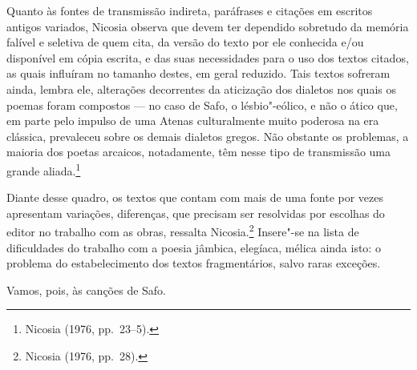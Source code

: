 Quanto às fontes de transmissão indireta, paráfrases e citações em escritos
antigos variados, Nicosia observa que devem ter dependido
sobretudo da memória falível e seletiva de quem cita, da versão do texto por
ele conhecida e/ou disponível em cópia escrita, e das suas necessidades para o
uso dos textos citados, as quais influíram no tamanho destes, em geral
reduzido. Tais textos sofreram ainda, lembra ele, alterações decorrentes da
aticização dos dialetos nos quais os poemas foram compostos --- no caso de Safo,
o lésbio"-eólico, e não o ático que, em parte pelo impulso de uma Atenas
culturalmente muito poderosa na era clássica, prevaleceu sobre os demais
dialetos gregos. Não obstante os problemas, a maioria dos poetas
arcaicos, notadamente, têm nesse tipo de transmissão uma grande aliada.\footnote{ Nicosia (1976, pp.~23--5).}

Diante desse quadro, os textos que contam com mais de uma fonte por vezes
apresentam variações, diferenças, que precisam ser resolvidas por escolhas do
editor no trabalho com as obras, ressalta Nicosia.\footnote{ Nicosia (1976, pp.~28).} Insere"-se na lista
de dificuldades do trabalho com a poesia jâmbica, elegíaca, mélica
ainda isto: o problema do estabelecimento dos textos fragmentários, salvo raras
exceções. 

Vamos, pois, às canções de Safo.


